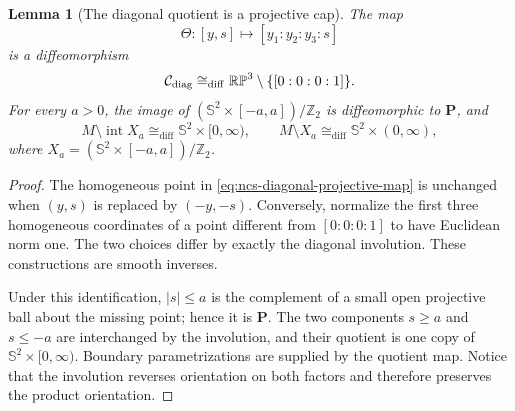 \documentclass[10pt]{coll-l}
\newcommand{\Sph}{\mathbb{S}}
\newcommand{\diffeo}{\mathrel{\cong_{\mathrm{diff}}}}
\newtheorem{lemma}[theorem]{Lemma}
\theoremstyle{definition}
\theoremstyle{remark}
\numberwithin{section}{chapter}
\numberwithin{equation}{chapter}
\begin{document}
\begin{lemma}[The diagonal quotient is a projective cap]
\label{lem:ncs-diagonal-projective-cap}
The map
\begin{equation}
 \Theta:[y,s]\longmapsto[y_1:y_2:y_3:s]                \label{eq:ncs-diagonal-projective-map}
\end{equation}
is a diffeomorphism
\begin{equation}
 \mathcal C_{\rm diag}\diffeo
       \mathbb{RP}^3\setminus\{[0:0:0:1]\}.            \label{eq:ncs-diagonal-punctured-RP3}
\end{equation}
For every $a>0$, the image of
$(\Sph^2\times[-a,a])/\mathbb Z_2$ is diffeomorphic to
$\mathbf P$, and
\begin{equation}
 M\setminus\operatorname{int}X_a\diffeo\Sph^2\times[0,\infty),
 \qquad M\setminus X_a\diffeo\Sph^2\times(0,\infty), \label{eq:ncs-diagonal-complements}
\end{equation}
where $X_a=(\Sph^2\times[-a,a])/\mathbb Z_2$.
\end{lemma}

\begin{proof}
The homogeneous point in \eqref{eq:ncs-diagonal-projective-map} is
unchanged when $(y,s)$ is replaced by $(-y,-s)$.  Conversely, normalize the
first three homogeneous coordinates of a point different from
$[0:0:0:1]$ to have Euclidean norm one.  The two choices differ by exactly
the diagonal involution.  These constructions are smooth inverses.

Under this identification, $|s|\leq a$ is the complement of a small open
projective ball about the missing point; hence it is $\mathbf P$.  The two
components $s\geq a$ and $s\leq-a$ are interchanged by the involution, and
their quotient is one copy of $\Sph^2\times[0,\infty)$.  Boundary
parametrizations are supplied by the quotient map.  Notice that the
involution reverses orientation on both factors and therefore preserves
the product orientation.
\end{proof}
\end{document}
